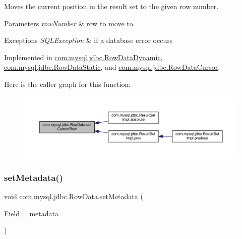 Moves the current position in the result set to the given row number.


\begin{DoxyParams}{Parameters}
{\em row\+Number} & row to move to \\
\hline
\end{DoxyParams}

\begin{DoxyExceptions}{Exceptions}
{\em S\+Q\+L\+Exception} & if a database error occurs \\
\hline
\end{DoxyExceptions}


Implemented in \mbox{\hyperlink{classcom_1_1mysql_1_1jdbc_1_1_row_data_dynamic_aab0a24e677281551b2f7e03e3ffd9c87}{com.\+mysql.\+jdbc.\+Row\+Data\+Dynamic}}, \mbox{\hyperlink{classcom_1_1mysql_1_1jdbc_1_1_row_data_static_a7ffde91e716fbad68c1ee53657ba969f}{com.\+mysql.\+jdbc.\+Row\+Data\+Static}}, and \mbox{\hyperlink{classcom_1_1mysql_1_1jdbc_1_1_row_data_cursor_a530066237bc36be6444d4c8c0ae01be2}{com.\+mysql.\+jdbc.\+Row\+Data\+Cursor}}.

Here is the caller graph for this function\+:
\nopagebreak
\begin{figure}[H]
\begin{center}
\leavevmode
\includegraphics[width=350pt]{interfacecom_1_1mysql_1_1jdbc_1_1_row_data_af1db64feefc1ecf2db53a72ec6063839_icgraph}
\end{center}
\end{figure}
\mbox{\label{interfacecom_1_1mysql_1_1jdbc_1_1_row_data_a4504dda637ff2fc39d8f19439fff8777}} 
\subsubsection{\texorpdfstring{set\+Metadata()}{setMetadata()}}
{\footnotesize\ttfamily void com.\+mysql.\+jdbc.\+Row\+Data.\+set\+Metadata (\begin{DoxyParamCaption}\item[{\mbox{\hyperlink{classcom_1_1mysql_1_1jdbc_1_1_field}{Field}} \mbox{[}$\,$\mbox{]}}]{metadata }\end{DoxyParamCaption})}


